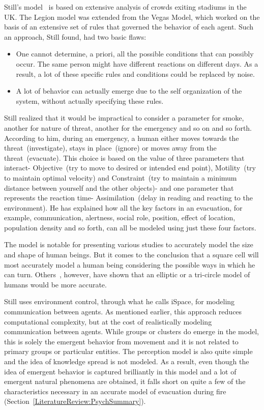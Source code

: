 Still's model~\cite{Still:2000tp} is based on extensive analysis of crowds exiting stadiums in the UK. The Legion model was extended from the Vegas Model, which worked on the basis of an extensive set of rules that governed the behavior of each agent. Such an approach, Still found, had two basic flaws:
\begin{itemize}
\item One cannot determine, a priori, all the possible conditions that can possibly occur. The same person might have different reactions on different days. As a result, a lot of these specific rules and conditions could be replaced by noise.
\item A lot of behavior can actually emerge due to the self organization of the system, without actually specifying these rules.
\end{itemize}
Still realized that it would be impractical to consider a parameter for smoke, another for nature of threat, another for the emergency and so on and so forth. According to him, during an emergency, a human either moves towards the threat~(investigate), stays in place~(ignore) or moves away from the threat~(evacuate). This choice is based on the value of three parameters that interact- Objective~(try to move to desired or intended end point), Motility~(try to maintain optimal velocity) and Constraint~(try to maintain a minimum distance between yourself and the other objects)- and one parameter that represents the reaction time- Assimilation~(delay in reading and reacting to the environment). He has explained how all the key factors in an evacuation, for example, communication, alertness, social role, position, effect of location, population density and so forth, can all be modeled using just these four factors.

The model is notable for presenting various studies to accurately model the size and shape of human beings. But it comes to the conclusion that a square cell will most accurately model a human being considering the possible ways in which he can turn. Others~\cite{Thompson:1995tm,Langston:2006kw}, however, have shown that an elliptic or a tri-circle model of humans would be more accurate.

Still uses environment control, through what he calls iSpace, for modeling communication between agents. As mentioned earlier, this approach reduces computational complexity, but at the cost of realistically modeling communication between agents. While groups or clusters do emerge in the model, this is solely the emergent behavior from movement and it is not related to primary groups or particular entities. The perception model is also quite simple and the idea of knowledge spread is not modeled. As a result, even though the idea of emergent behavior is captured brilliantly in this model and a lot of emergent natural phenomena are obtained, it falls short on quite a few of the characteristics necessary in an accurate model of evacuation during fire (Section~\ref{LiteratureReview:PsychSummary}).

